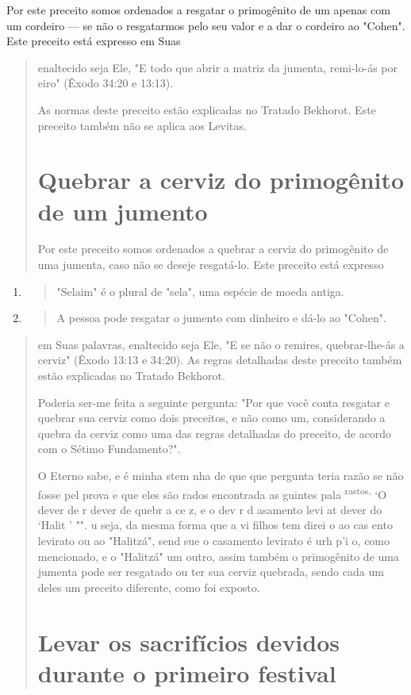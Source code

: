 Por este preceito somos ordenados a resgatar o primogênito de um apenas
com um cordeiro --- se não o resgatarmos pelo seu valor e a dar o
cordeiro ao "Cohen". Este preceito está expresso em Suas

\begin{quote}
enaltecido seja Ele, "E todo que abrir a matriz da jumenta, remi-lo-ás
por eiro" (Êxodo 34:20 e 13:13).

As normas deste preceito estão explicadas no Tratado Bekhorot. Es­te
preceito também não se aplica aos Levitas.

\section{Quebrar a cerviz do primogênito de um jumento}

Por este preceito somos ordenados a quebrar a cerviz do primogê­nito de
uma jumenta, caso não se deseje resgatá-lo. Este preceito está expresso
\end{quote}

\begin{enumerate}
\def\labelenumi{\arabic{enumi}.}
\setcounter{enumi}{102}
\item
 \begin{quote}
 "Selaim" é o plural de "sela", uma espécie de moeda antiga.
 \end{quote}
\item
 \begin{quote}
 A pessoa pode resgatar o jumento com dinheiro e dá-lo ao "Cohen".
 \end{quote}
\end{enumerate}

\begin{quote}em Suas palavras, enaltecido seja Ele, "E se não o remires,
quebrar-lhe-ás a cer­viz" (Êxodo 13:13 e 34:20). As regras detalhadas
deste preceito também estão explicadas no Tratado Bekhorot.

Poderia ser-me feita a seguinte pergunta: "Por que você conta resga­tar
e quebrar sua cerviz como dois preceitos, e não como um, considerando a
quebra da cerviz como uma das regras detalhadas do preceito, de acordo
com o Sétimo Fundamento?".

O Eterno sabe, e é minha stem nha de que que pergunta teria razão se não
fosse pel prova e que eles são rados encontrada as guintes pala
\textsuperscript{rastos,} `O dever de r dever de quebr a ce z, e o dev r
d asamento levi at dever do `Halit ' "". u seja, da mesma forma que a vi
filhos tem direi o ao cas ento levirato ou ao "Halitzá", send sue o
casamen­to levirato é urh p'i o, como mencionado, e o "Halitzá" um
outro, assim também o primogênito de uma jumenta pode ser resgatado ou
ter sua cerviz quebrada, sendo cada um deles um preceito diferente, como
foi exposto.

\section{Levar os sacrifícios devidos durante o primeiro festival}
\end{quote}

